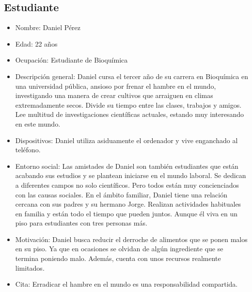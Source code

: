 \subsection{Estudiante}
\begin{itemize}
    \item Nombre: Daniel Pérez
    \item Edad: 22 años
    \item Ocupación: Estudiante de Bioquímica
    \item Descripción general: Daniel cursa el tercer año de su carrera en Bioquímica en una universidad pública, ansioso por frenar el hambre en el mundo, investigando una manera de crear cultivos que arraiguen en climas extremadamente secos. Divide su tiempo entre las clases, trabajos y amigos. Lee multitud de investigaciones científicas actuales, estando muy interesando en este mundo.
    \item Dispositivos: Daniel utiliza asiduamente el ordenador y vive enganchado al teléfono.
    \item Entorno social: Las amistades de Daniel son también estudiantes que están acabando sus estudios y se plantean iniciarse en el mundo laboral. Se dedican a diferentes campos no solo científicos. Pero todos están muy concienciados con las causas sociales. En el ámbito familiar, Daniel tiene una relación cercana con sus padres y su hermano Jorge. Realizan actividades habituales en familia y están todo el tiempo que pueden juntos. Aunque él viva en un piso para estudiantes con tres personas más.
    \item Motivación: Daniel busca reducir el derroche de alimentos que se ponen malos en su piso. Ya que en ocasiones se olvidan de algún ingrediente que se termina poniendo malo. Además, cuenta con unos recursos realmente limitados. 
    \item Cita: Erradicar el hambre en el mundo es una responsabilidad compartida.
\end{itemize}

